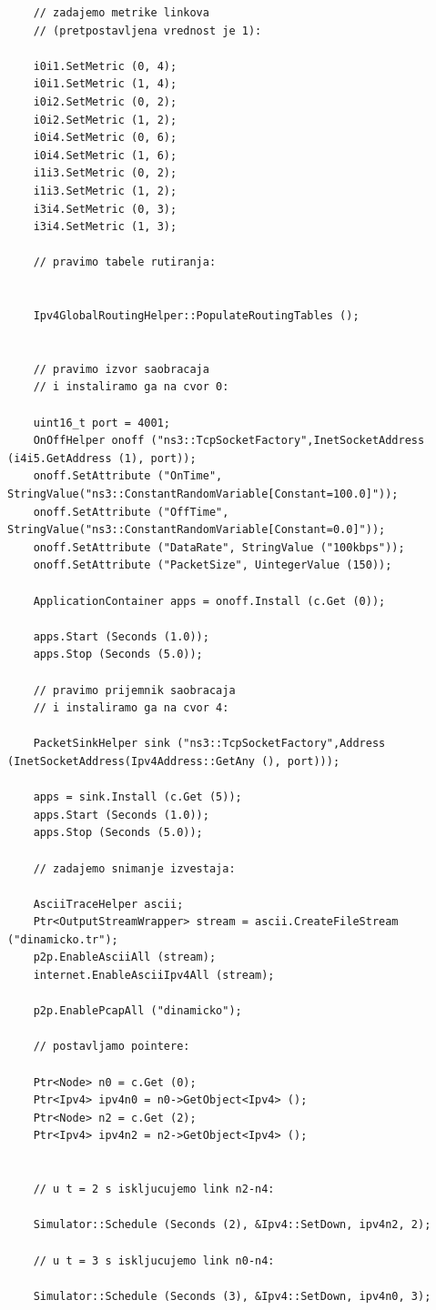 \documentclass[a4paper,12pt, Projekat]{etf}
\begin{document}
\begin{itemize}
\begin{verbatim}
	// zadajemo metrike linkova
	// (pretpostavljena vrednost je 1):

	i0i1.SetMetric (0, 4);
	i0i1.SetMetric (1, 4);
	i0i2.SetMetric (0, 2);
	i0i2.SetMetric (1, 2);
	i0i4.SetMetric (0, 6);
	i0i4.SetMetric (1, 6);
	i1i3.SetMetric (0, 2);
	i1i3.SetMetric (1, 2);
	i3i4.SetMetric (0, 3);
	i3i4.SetMetric (1, 3);

	// pravimo tabele rutiranja:
	

	Ipv4GlobalRoutingHelper::PopulateRoutingTables ();
	

	// pravimo izvor saobracaja
	// i instaliramo ga na cvor 0:

	uint16_t port = 4001;
	OnOffHelper onoff ("ns3::TcpSocketFactory",InetSocketAddress (i4i5.GetAddress (1), port));
	onoff.SetAttribute ("OnTime",  StringValue("ns3::ConstantRandomVariable[Constant=100.0]"));
	onoff.SetAttribute ("OffTime",  StringValue("ns3::ConstantRandomVariable[Constant=0.0]"));
	onoff.SetAttribute ("DataRate", StringValue ("100kbps"));
	onoff.SetAttribute ("PacketSize", UintegerValue (150));

	ApplicationContainer apps = onoff.Install (c.Get (0));
	
	apps.Start (Seconds (1.0));
	apps.Stop (Seconds (5.0));

	// pravimo prijemnik saobracaja
	// i instaliramo ga na cvor 4:

	PacketSinkHelper sink ("ns3::TcpSocketFactory",Address (InetSocketAddress(Ipv4Address::GetAny (), port)));

	apps = sink.Install (c.Get (5));
	apps.Start (Seconds (1.0));
	apps.Stop (Seconds (5.0));

	// zadajemo snimanje izvestaja:
	
	AsciiTraceHelper ascii;
	Ptr<OutputStreamWrapper> stream = ascii.CreateFileStream ("dinamicko.tr");
	p2p.EnableAsciiAll (stream);
	internet.EnableAsciiIpv4All (stream);

	p2p.EnablePcapAll ("dinamicko");

	// postavljamo pointere:

	Ptr<Node> n0 = c.Get (0);
	Ptr<Ipv4> ipv4n0 = n0->GetObject<Ipv4> ();
	Ptr<Node> n2 = c.Get (2);
	Ptr<Ipv4> ipv4n2 = n2->GetObject<Ipv4> ();


	// u t = 2 s iskljucujemo link n2-n4:

	Simulator::Schedule (Seconds (2), &Ipv4::SetDown, ipv4n2, 2);

	// u t = 3 s iskljucujemo link n0-n4:

	Simulator::Schedule (Seconds (3), &Ipv4::SetDown, ipv4n0, 3);


\end{verbatim}
\end{itemize}
\end{document}
